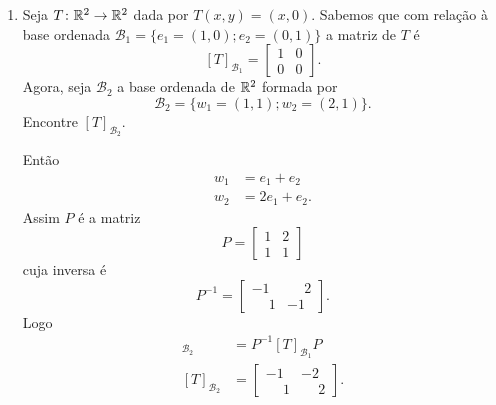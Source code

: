 \begin{exemplos}
\begin{enumerate}[label={\arabic*})]
        \item Seja $T \colon \mathbb{R}^2 \to \mathbb{R}^2$ dada por $T(x,y) = (x,0)$. Sabemos que com relação à base ordenada $\mathcal{B}_1 = \{e_1=(1,0);e_2=(0,1)\}$ a matriz de $T$ é
        \[
            [T]_{\mathcal{B}_1} = \begin{bmatrix}
            1 & 0\\
            0 & 0
            \end{bmatrix}.
        \]
        Agora, seja $\mathcal{B}_2$ a base ordenada de $\mathbb{R}^2$ formada por
        \[
            \mathcal{B}_2 = \{w_1 = (1,1);w_2=(2,1)\}.
        \]
        Encontre $[T]_{\mathcal{B}_2}$.
        \begin{solucao}
            Então
            \begin{align*}
            w_1 &= e_1 + e_2\\
            w_2 &= 2e_1 + e_2.
            \end{align*}
            Assim $P$ é a matriz
            \[
                P = \begin{bmatrix}
                1 & 2\\
                1 & 1
                \end{bmatrix}
            \]
            cuja inversa é
            \[
                P^{-1} = \begin{bmatrix}
                -1 & \phantom{-}2\\
                \phantom{-}1 & -1
                \end{bmatrix}.
            \]
            Logo
            \begin{align*}
                [T]_{\mathcal{B}_2} &= P^{-1}[T]_{\mathcal{B}_1}P\\
                [T]_{\mathcal{B}_2} &= \begin{bmatrix}
                -1 & -2\\
                \phantom{-}1 & \phantom{-}2
                \end{bmatrix}.
            \end{align*}
        \end{solucao}


\end{enumerate}
\end{exemplos}

